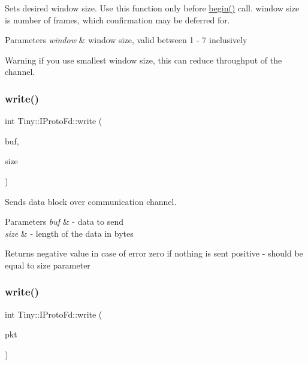 Sets desired window size. Use this function only before \hyperlink{classTiny_1_1IProtoFd_aae4e613316866105c130d613ecb25dd4}{begin()} call. window size is number of frames, which confirmation may be deferred for. 
\begin{DoxyParams}{Parameters}
{\em window} & window size, valid between 1 -\/ 7 inclusively \\
\hline
\end{DoxyParams}
\begin{DoxyWarning}{Warning}
if you use smallest window size, this can reduce throughput of the channel. 
\end{DoxyWarning}
\mbox{\label{classTiny_1_1IProtoFd_adea59df6702e16fd986a91c7ee62012a}} 
\subsubsection{\texorpdfstring{write()}{write()}\hspace{0.1cm}{\footnotesize\ttfamily [1/2]}}
{\footnotesize\ttfamily int Tiny\+::\+I\+Proto\+Fd\+::write (\begin{DoxyParamCaption}\item[{char $\ast$}]{buf,  }\item[{int}]{size }\end{DoxyParamCaption})}

Sends data block over communication channel. 
\begin{DoxyParams}{Parameters}
{\em buf} & -\/ data to send \\
\hline
{\em size} & -\/ length of the data in bytes \\
\hline
\end{DoxyParams}
\begin{DoxyReturn}{Returns}
negative value in case of error zero if nothing is sent positive -\/ should be equal to size parameter 
\end{DoxyReturn}
\mbox{\label{classTiny_1_1IProtoFd_aa822a1dec320e6edc70a84699371fe81}} 
\subsubsection{\texorpdfstring{write()}{write()}\hspace{0.1cm}{\footnotesize\ttfamily [2/2]}}
{\footnotesize\ttfamily int Tiny\+::\+I\+Proto\+Fd\+::write (\begin{DoxyParamCaption}\item[{\hyperlink{classTiny_1_1IPacket}{I\+Packet} \&}]{pkt }\end{DoxyParamCaption})}

